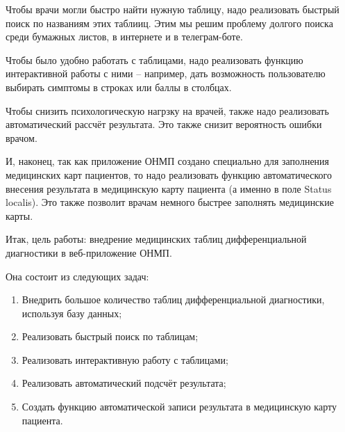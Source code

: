 Чтобы врачи могли быстро найти нужную таблицу, надо реализовать быстрый поиск по названиям этих таблииц. Этим мы решим проблему долгого поиска среди бумажных листов, в интернете и в телеграм-боте.

Чтобы было удобно работать с таблицами, надо реализовать функцию интерактивной работы с ними -- например, дать возможность пользователю выбирать симптомы в строках или баллы в столбцах.

Чтобы снизить психологическую нагрзку на врачей, также надо реализовать автоматический рассчёт результата. Это также снизит вероятность ошибки врачом.

И, наконец, так как приложение ОНМП создано специально для заполнения медицинских карт пациентов, то надо реализовать функцию автоматического внесения результата в медицинскую карту пациента (а именно в поле Status localis). Это также позволит врачам немного быстрее заполнять медицинские карты.

Итак, цель работы: внедрение медицинских таблиц дифференциальной диагностики в веб-приложение ОНМП.

Она состоит из следующих задач:

\begin{enumerate}
  \item Внедрить большое количество таблиц дифференциальной диагностики, используя базу данных;
  \item Реализовать быстрый поиск по таблицам;
  \item Реализовать интерактивную работу с таблицами;
  \item Реализовать автоматический подсчёт результата;
  \item Создать функцию автоматической записи результата в медицинскую карту пациента.
\end{enumerate}
